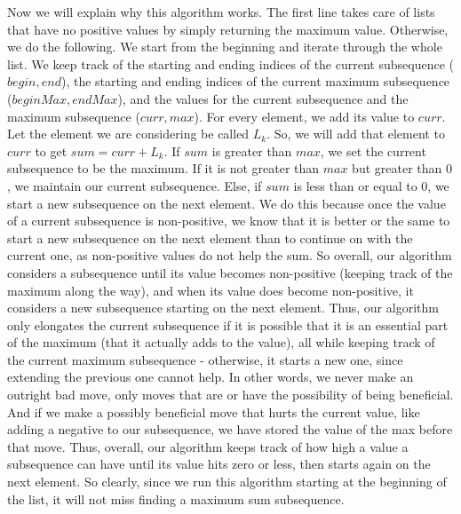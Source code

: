\documentclass{article}
\begin{document}
Now we will explain why this algorithm works. The first line takes care of lists
that have no positive values by simply returning the maximum value. Otherwise,
we do the following. We start from the
beginning and iterate through the whole list. We keep track of the starting and
ending indices of the current subsequence ($begin,end$), the starting and ending
indices of the current maximum subsequence ($beginMax,endMax$), and the values
for the current subsequence and the maximum subsequence ($curr,max$). For every element, we add its
value to $curr$. Let the element we are considering be called $L_k$.
So, we will add that element to $curr$ to get $sum = curr + L_k$. If $sum$ is
greater than $max$, we set the current subsequence to be the maximum. If it is
not greater than $max$ but greater than $0$, we maintain our current
subsequence. Else, if $sum$ is less than or equal to $0$, we start a new
subsequence on the next element. We do this because once the value of a current
subsequence is non-positive, we know that it is better or the same to start a new
subsequence on the next element than to continue on with the current one, as
non-positive values do not help the sum. So overall, our algorithm considers
a subsequence until its value becomes non-positive (keeping track of the
maximum along the way), and when its value does become non-positive, it
considers a new subsequence starting on the next element. Thus, our algorithm
only elongates the current subsequence if it is possible that it is an essential
part of the maximum (that it actually adds to the value), all while keeping track of
the current maximum subsequence
- otherwise, it starts a new one, since extending the previous one cannot help.
In other words, we never make an outright bad move, only moves that are or have
the possibility of being beneficial. And if we make a possibly beneficial move
that hurts the current value, like adding a negative to our subsequence, we have
stored the value of the max before that move. Thus, overall, our algorithm keeps
track of how high a value a subsequence can have until its value hits zero or
less, then starts again on the next element.
So clearly, since we run this algorithm starting at the beginning of the list,
it will not miss finding a maximum sum subsequence.
\newpage

\end{document}
